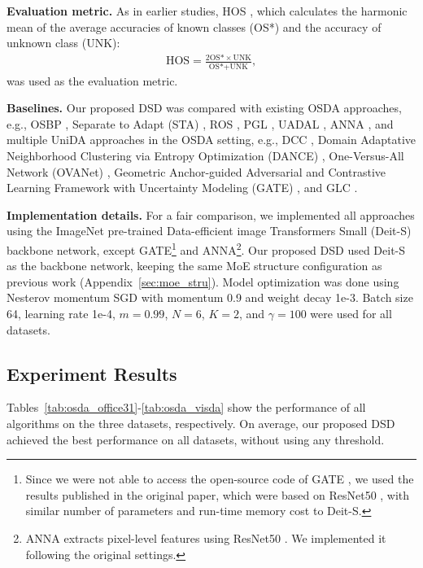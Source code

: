 \documentclass[10pt,twocolumn,letterpaper]{article}
\begin{document}
\textbf{Evaluation metric.} As in earlier studies, HOS \cite{bucci2020effectiveness}, which calculates the harmonic mean of the average accuracies of known classes (OS*) and the accuracy of unknown class (UNK):
\begin{align}
  \text{HOS} = \frac{2\text{OS*}\times \text{UNK}}{\text{OS*}+\text{UNK}},
\end{align}
was used as the evaluation metric.

\textbf{Baselines.} Our proposed DSD was compared with existing OSDA approaches, e.g., OSBP \cite{saito2018open}, Separate to Adapt (STA) \cite{liu2019separate}, ROS \cite{bucci2020effectiveness}, PGL \cite{luo2020progressive}, UADAL \cite{jang2022unknown}, ANNA \cite{li2023adjustment}, and multiple UniDA approaches in the OSDA setting, e.g., DCC \cite{li2021domain}, Domain Adaptative Neighborhood Clustering via Entropy Optimization (DANCE) \cite{saito2020universal}, One-Versus-All Network (OVANet) \cite{saito2021ovanet}, Geometric Anchor-guided Adversarial and Contrastive Learning Framework with Uncertainty Modeling (GATE) \cite{chen2022geometric}, and GLC \cite{sanqing2023GLC}.

\textbf{Implementation details.} For a fair comparison, we implemented all approaches using the ImageNet \cite{deng2009imagenet} pre-trained Data-efficient image Transformers Small (Deit-S) \cite{touvron2021training} backbone network, except GATE\footnote{Since we were not able to access the open-source code of GATE \cite{chen2022geometric}, we used the results published in the original paper, which were based on ResNet50 \cite{he2016deep}, with similar number of parameters and run-time memory cost to Deit-S.} and ANNA\footnote{ANNA \cite{li2023adjustment} extracts pixel-level features using ResNet50 \cite{he2016deep}. We implemented it following the original settings.}. Our proposed DSD used Deit-S as the backbone network, keeping the same MoE structure configuration as previous work \cite{li2023sparse} (Appendix~\ref{sec:moe_stru}). Model optimization was done using Nesterov momentum SGD with momentum 0.9 and weight decay 1e-3. Batch size 64, learning rate 1e-4, $m=0.99$, $N=6$, $K=2$, and $\gamma=100$ were used for all datasets.

\subsection{Experiment Results}

Tables~\ref{tab:osda_office31}-\ref{tab:osda_visda} show the performance of all algorithms on the three datasets, respectively. On average, our proposed DSD achieved the best performance on all datasets, without using any threshold.
\end{document}
